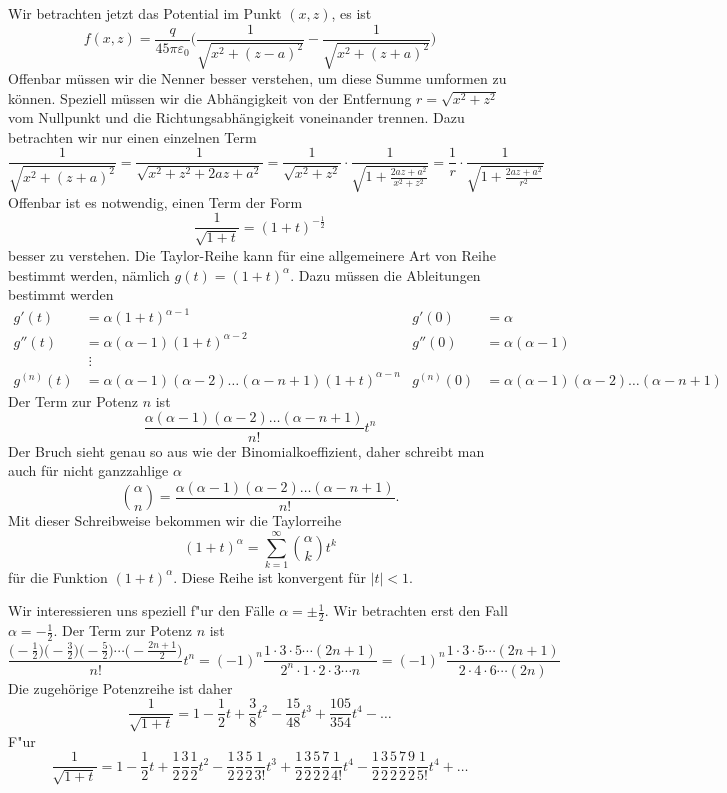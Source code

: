 Wir betrachten jetzt das Potential im Punkt $(x,z)$, es ist
\[
f(x,z)
=
\frac{q}{45\pi\varepsilon_0}
\biggl(
\frac{1}{\sqrt{x^2 + (z-a)^2}}
-
\frac{1}{\sqrt{x^2 + (z+a)^2}}
\biggr)
\]
Offenbar müssen wir die Nenner besser verstehen, um diese Summe 
umformen zu können.
Speziell müssen wir die Abhängigkeit von der Entfernung
$r=\sqrt{x^2+z^2}$ vom Nullpunkt
und die Richtungsabhängigkeit voneinander trennen.
Dazu betrachten wir nur einen einzelnen Term
\[
\frac{1}{\sqrt{x^2+(z+a)^2}}
=
\frac{1}{\sqrt{x^2+z^2+2az+a^2}}
=
\frac{1}{\sqrt{x^2+z^2}} \cdot \frac{1}{\sqrt{1+\frac{2az+a^2}{x^2+z^2}}}
=
\frac{1}{r} \cdot \frac{1}{\sqrt{1+\frac{2az+a^2}{r^2}}}
\]
Offenbar ist es notwendig, einen Term der Form
\[
\frac{1}{\sqrt{1+t}}
=
(1+t)^{-\frac12}
\]
besser zu verstehen.
Die Taylor-Reihe kann für eine allgemeinere Art von Reihe bestimmt werden,
nämlich $g(t)=(1+t)^\alpha$.
Dazu müssen die Ableitungen bestimmt werden
\begin{align*}
g'(t)
&=
\alpha(1+t)^{\alpha-1}
&
g'(0)&=\alpha
\\
g''(t)
&=
\alpha(\alpha-1)(1+t)^{\alpha-2}
&
g''(0)&=\alpha(\alpha-1)
\\
&\;\vdots
\\
g^{(n)}(t)
&=
\alpha(\alpha-1)(\alpha-2)\dots(\alpha-n+1) (1+t)^{\alpha -n}
&
g^{(n)}(0)&=\alpha(\alpha-1)(\alpha-2)\dots(\alpha -n +1)
\end{align*}
Der Term zur Potenz $n$ ist
\[
\frac{\alpha(\alpha-1)(\alpha-2)\dots(\alpha-n+1)}{n!} t^n
\]
Der Bruch sieht genau so aus wie der Binomialkoeffizient, daher schreibt
man auch für nicht ganzzahlige $\alpha$
\[
\binom{\alpha}{n}
=
\frac{\alpha(\alpha-1)(\alpha-2)\dots(\alpha-n+1)}{n!}.
\]
Mit dieser Schreibweise bekommen wir die Taylorreihe
\[
(1+t)^\alpha=\sum_{k=1}^\infty \binom{\alpha}{k} t^k
\]
für die Funktion $(1+t)^\alpha$.
Diese Reihe ist konvergent für $|t|<1$.

Wir interessieren uns speziell f"ur den Fälle $\alpha=\pm\frac12$.
Wir betrachten erst den Fall $\alpha=-\frac12$.
Der Term zur Potenz $n$ ist
\[
\frac{
\bigl(-\frac12\bigr)
\bigl(-\frac32\bigr)
\bigl(-\frac52\bigr)
\cdots
\bigl(-\frac{2n+1}2\bigr)}{n!} t^n
=
(-1)^n \frac{1\cdot 3\cdot 5 \cdots (2n + 1)}{2^n\cdot 1\cdot 2\cdot 3\cdots n}
=
(-1)^n \frac{1\cdot 3\cdot 5 \cdots (2n+1)}{2\cdot 4\cdot 6\cdots (2n)}
\]
Die zugehörige Potenzreihe ist daher
\[
\frac1{\sqrt{1+t}}
=
1-\frac12t+\frac3{8}t^2-\frac{15}{48}t^3+\frac{105}{354}t^4-\dots
\]
F"ur 
\[
\frac1{\sqrt{1+t}}
=
1-\frac12 t
+ \frac12\frac32\frac12 t^2
- \frac 12\frac32\frac 52\frac1{3!} t^3
+ \frac 12\frac32\frac 52\frac72\frac1{4!} t^4
- \frac 12\frac32\frac 52\frac72\frac92\frac1{5!} t^4
+\dots
\]


